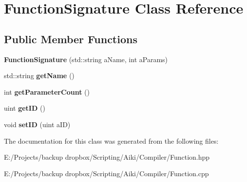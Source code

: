 \hypertarget{a00011}{\section{Function\+Signature Class Reference}
\label{a00011}
}
\subsection*{Public Member Functions}
\begin{DoxyCompactItemize}
\item 
\hypertarget{a00011_a2b563532d18fb61145c005ca5ce9c460}{{\bfseries Function\+Signature} (std\+::string a\+Name, int a\+Params)}\label{a00011_a2b563532d18fb61145c005ca5ce9c460}

\item 
\hypertarget{a00011_a785ace56c6b09896a075e282dccc3b53}{std\+::string {\bfseries get\+Name} ()}\label{a00011_a785ace56c6b09896a075e282dccc3b53}

\item 
\hypertarget{a00011_ade2d65b7212c39caa2ad5a48550f464d}{int {\bfseries get\+Parameter\+Count} ()}\label{a00011_ade2d65b7212c39caa2ad5a48550f464d}

\item 
\hypertarget{a00011_a4b86cb0d46a2c03fe32714c4313e58d2}{uint {\bfseries get\+I\+D} ()}\label{a00011_a4b86cb0d46a2c03fe32714c4313e58d2}

\item 
\hypertarget{a00011_a882b70c9d2e096f355ccca91962cc9e2}{void {\bfseries set\+I\+D} (uint a\+I\+D)}\label{a00011_a882b70c9d2e096f355ccca91962cc9e2}

\end{DoxyCompactItemize}


The documentation for this class was generated from the following files\+:\begin{DoxyCompactItemize}
\item 
E\+:/\+Projects/backup dropbox/\+Scripting/\+Aiki/\+Compiler/Function.\+hpp\item 
E\+:/\+Projects/backup dropbox/\+Scripting/\+Aiki/\+Compiler/Function.\+cpp\end{DoxyCompactItemize}
